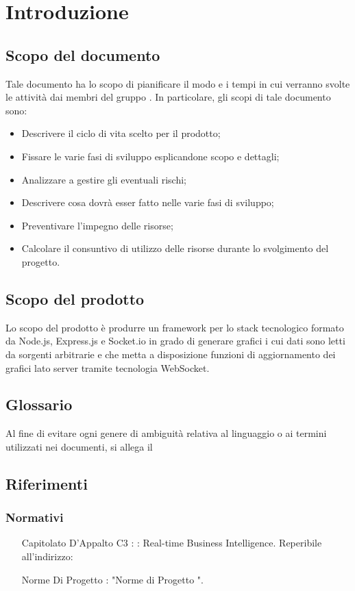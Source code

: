 \section{Introduzione}
	\subsection{Scopo del documento}
		Tale documento ha lo scopo di pianificare il modo e i tempi in cui verranno svolte le attività dai membri del gruppo \groupname.
		In particolare, gli scopi di tale documento sono:
		\begin{itemize}
			\item Descrivere il ciclo di vita scelto per il prodotto;
			\item Fissare le varie fasi di sviluppo esplicandone scopo e dettagli;
			\item Analizzare a gestire gli eventuali rischi;
			\item Descrivere cosa dovrà esser fatto nelle varie fasi di sviluppo;
			\item Preventivare l'impegno delle risorse;
			\item Calcolare il consuntivo di utilizzo delle risorse durante lo svolgimento del progetto.
		\end{itemize}
	\subsection{Scopo del prodotto}
		Lo scopo del prodotto è produrre un framework per lo stack tecnologico formato da Node.js, Express.js e Socket.io in grado di generare grafici i cui dati sono letti da sorgenti arbitrarie e che metta a disposizione funzioni di aggiornamento dei grafici lato server tramite tecnologia WebSocket.
	\subsection{Glossario}
		Al fine di evitare ogni genere di ambiguità relativa al linguaggio o ai termini utilizzati nei documenti, si allega il 
	\subsection{Riferimenti}
		\subsubsection{Normativi}
			\begin{itemize}
				\item[Capitolato D'Appalto C3]: \projectname: Real-time Business Intelligence. Reperibile all'indirizzo: 
				\item[Norme Di Progetto]: "Norme di Progetto \lastversion".
			\end{itemize}

